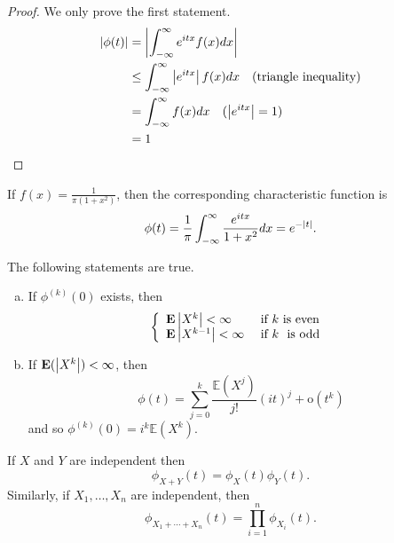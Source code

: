 \begin{proof}
We only prove the first statement.
\begin{equation*}
    \begin{split}
        \left\vert \phi(t) \right\vert &= \left\vert \int_{-\infty}^\infty e^{itx} f(x)dx  \right\vert \\
        &\leq \int_{-\infty}^\infty \left\vert e^{itx} \right\vert f(x) dx \quad \text{(triangle inequality)} \\
        &= \int_{-\infty}^\infty f(x) dx \quad (\left\vert e^{itx} \right\vert=1) \\
        &= 1
    \end{split}
\end{equation*}
\end{proof}

\begin{example}
If $f(x) = 
\frac{1}{\pi(1+x^2)}$, then the corresponding characteristic function is 
\begin{equation*}
    \phi(t)=\frac{1}{\pi} \int_{-\infty}^{\infty} \frac{e^{i t x}}{1+x^{2}} d x = e^{-\left\vert t \right\vert}.
\end{equation*}
\end{example}

\begin{theorem}
The following statements are true.
\begin{enumerate}[(a)]
    \item If $\phi^{(k)}(0)$ exists, then 
    \begin{equation*}
        \left\{\begin{array}{ll}{\mathbf{E}\left|X^{k}\right|<\infty} & {\text { if $k$}  \text { is even }} \\ {\mathbf{E}\left|X^{k-1}\right|<\infty} & {\text { if $k$ } \text { is odd }}\end{array}\right.
    \end{equation*}
    
    \item If $\mathbf{E}(\left\vert X^k \right\vert) < \infty$, then 
    \begin{equation*}
        \phi(t)=\sum_{j=0}^{k} \frac{\mathbb{E}\left(X^{j}\right)}{j !}(i t)^{j}+\mathrm{o}\left(t^{k}\right)
    \end{equation*}
    and so $\phi^{(k)}(0)=i^{k} \mathbb{E}\left(X^{k}\right)$.
\end{enumerate}
\end{theorem}
\begin{theorem}
If $X$ and $Y$ are independent then 
\begin{equation*}
    \phi_{X+Y}(t)=\phi_{X}(t) \phi_{Y}(t).
\end{equation*}
Similarly, if $X_1, \dots, X_n$ are independent, then 
\begin{equation*}
    \phi_{X_1 + \cdots + X_n}(t)= \prod_{i=1}^n \phi_{X_i}(t).
\end{equation*}
\end{theorem}

